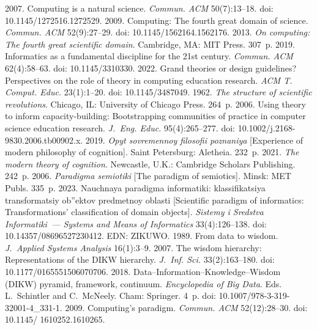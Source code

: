 \begin{multicols}{2}
{{\begin{thebibliography}{99}
 2007. Computing is a natural science. \textit{Commun. ACM} 50(7):13--18. doi: 
10.1145/1272516.1272529.
 2009. Computing: The fourth great domain of science. 
\textit{Commun. ACM} 52(9):27--29. doi: 10.1145/1562164.1562176.
 2013. \textit{On computing: The fourth great scientific domain}. Cambridge, 
MA: MIT Press. 307~p. 
 2019. Informatics as a fundamental 
discipline for the 21st century. \textit{Commun. ACM} 62(4):58--63. doi: 10.1145/3310330.
 2022. Grand theories or design guidelines? Perspectives on the role of 
theory in computing education research. \textit{ACM T. Comput. Educ.} 23(1):1--20. doi: 10.1145/3487049.
 1962. \textit{The structure of scientific revolutions}. Chicago, IL: University of Chicago 
Press. 264~p.
 2006. Using theory to inform capacity-building: Bootstrapping 
communities of practice in computer science education research. \textit{J.~Eng. Educ.} 95(4):265--277. doi: 
10.1002/j.2168-9830.2006.tb00902.x.
 2019. \textit{Opyt sovremennoy filosofii po\-zna\-niya} [Experience of modern 
philosophy of cognition]. Saint Petersburg: Aletheia. 232~p.
 2021. \textit{The modern theory of cognition}. Newcastle, U.K.: Cambridge 
Scholars Publishing. 242~p.
 2006. \textit{Paradigma semiotiki} [The paradigm of semiotics]. Minsk: MET Publs. 
335~p.
 2023. Nauchnaya paradigma informatiki: klassifikatsiya transformatsiy ob''ektov 
predmetnoy oblasti [Scientific paradigm of informatics: Transformations' classification of domain objects]. 
\textit{Sistemy i Sredstva Informatiki~--- Systems and Means of Informatics} 33(4):126--138. doi: 
10.14357/08696527230412. EDN: ZIKUWO.
 1989. From data to wisdom. \textit{J.~Applied Systems Analysis} 16(1):3--9.
 2007. The wisdom hierarchy: Representations of the DIKW hierarchy. \textit{J.~Inf. Sci.} 
33(2):163--180. doi: 10.1177/0165551506070706.
 2018. Data--Information--Knowledge--Wisdom (DIKW) pyramid, framework, continuum. 
\textit{Encyclopedia of Big Data}. Eds. L.~Schintler and C.~\mbox{McNeely}. Cham: Springer. 4~p. doi: 
10.1007/978-3-319-32001-4\_331-1.
 2009. Computing's paradigm. \textit{Commun. ACM} 52(12):28--30. 
doi: 10.1145/ 1610252.1610265.


\end{thebibliography}}}
\end{multicols}
